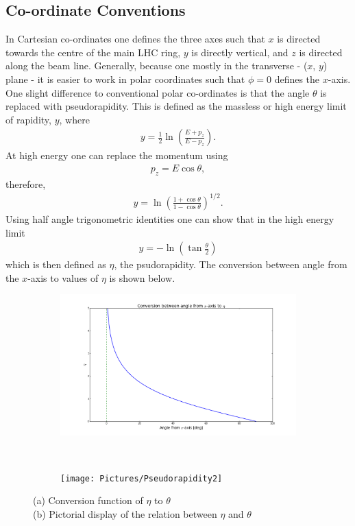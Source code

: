 \subsection{Co-ordinate Conventions}
In Cartesian co-ordinates one defines the three axes such that $x$ is directed towards the centre of the main LHC ring, $y$ is directly vertical, and $z$ is directed along the beam line.
Generally, because one mostly in the transverse - ($x$, $y$) plane - it is easier to work in polar coordinates such that $\phi=0$ defines the $x$-axis.
One slight difference to conventional polar co-ordinates is that the angle $\theta$ is replaced with pseudorapidity. 
This is defined as the massless or high energy limit of rapidity, $y$, where
\begin{align}
y = \frac{1}{2} \ln \left( \frac{E + p_{z}}{E - p_{z}} \right).
\end{align}
At high energy one can replace the momentum using
\begin{align}
p_{z} = E \cos \theta, 
\end{align}
therefore,
\begin{align}
y = \ln \left( \frac{1 + \cos \theta}{1 - \cos \theta} \right)^{1/2}.
\end{align}
Using half angle trigonometric identities one can show that in the high energy limit
\begin{align}
y = - \ln \left( \tan \frac{\theta}{2} \right)
\end{align}
which is then defined as $\eta$, the psudorapidity.
The conversion between angle from the $x$-axis to values of $\eta$ is shown below.

\begin{figure}[H]
    \centering
    \begin{subfigure}[b]{0.48\textwidth}
        \centering
        \includegraphics[width=\textwidth]{Pictures/etaConversion.png}
    \caption{}
    \end{subfigure}
    ~
    \begin{subfigure}[b]{0.48\textwidth}
        \centering
        \texttt{[image: Pictures/Pseudorapidity2]}
    \caption{}    
        \end{subfigure}
\caption{(a) Conversion function of $\eta$ to $\theta$ \\ (b) Pictorial display of the relation between $\eta$ and $\theta$}
\label{fig:etaConversion}
\end{figure}

